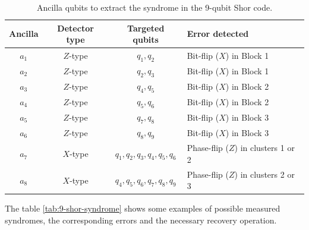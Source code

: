 \begin{table}[hbt!]
    \centering
    \renewcommand{\arraystretch}{1.2}
    \begin{tabularx}{\textwidth}{@{}cccX@{}}
    \toprule
    \textbf{Ancilla} & \textbf{Detector type} & \textbf{Targeted qubits} & \textbf{Error detected} \\ \midrule
    $a_1$ & $Z$-type & $q_1, q_2$ & Bit-flip ($X$) in Block 1 \\
    $a_2$ & $Z$-type & $q_2, q_3$ & Bit-flip ($X$) in Block 1 \\
    $a_3$ & $Z$-type & $q_4, q_5$ & Bit-flip ($X$) in Block 2 \\
    $a_4$ & $Z$-type & $q_5, q_6$ & Bit-flip ($X$) in Block 2 \\
    $a_5$ & $Z$-type & $q_7, q_8$ & Bit-flip ($X$) in Block 3 \\
    $a_6$ & $Z$-type & $q_8, q_9$ & Bit-flip ($X$) in Block 3 \\
    $a_7$ & $X$-type & $q_1, q_2, q_3, q_4, q_5, q_6$ & Phase-flip ($Z$) in clusters 1 or 2 \\
    $a_8$ & $X$-type & $q_4, q_5, q_6,  q_7, q_8, q_9$ & Phase-flip ($Z$) in clusters 2 or 3 \\ \bottomrule
    \end{tabularx}
    \caption{Ancilla qubits to extract the syndrome in the 9-qubit Shor code.}
    \label{tab:9-shor-ancilla}
\end{table}

The table \ref{tab:9-shor-syndrome} shows some examples of possible measured syndromes, the corresponding errors and the necessary recovery operation.

